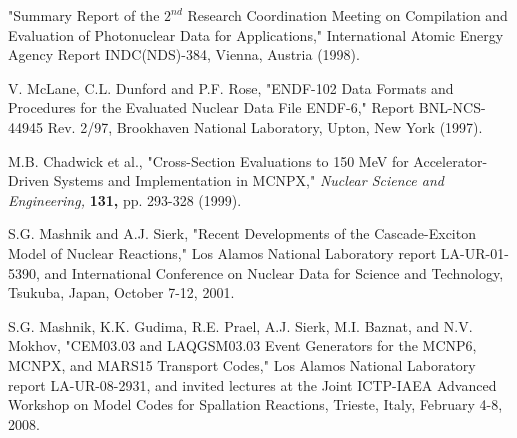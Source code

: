  "Summary Report of the $2^{nd}$ Research Coordination 
Meeting on Compilation and Evaluation of Photonuclear Data for 
Applications," International Atomic Energy Agency Report INDC(NDS)-384, 
Vienna, Austria (1998).

 V. McLane, C.L. Dunford and P.F. Rose, "ENDF-102 Data 
Formats and Procedures for the Evaluated Nuclear Data File ENDF-6," Report 
BNL-NCS-44945 Rev. 2/97, Brookhaven National Laboratory, Upton, New York 
(1997).

 M.B. Chadwick et al., "Cross-Section Evaluations to 
150 MeV for Accelerator-Driven Systems and Implementation in MCNPX," 
\textit{Nuclear Science and Engineering,} \textbf{131,} pp. 293-328 (1999).

 S.G. Mashnik and A.J. Sierk, "Recent Developments
of the Cascade-Exciton Model of Nuclear Reactions," Los Alamos National 
Laboratory report LA-UR-01-5390, and International Conference on Nuclear 
Data for Science and Technology, Tsukuba, Japan, October 7-12, 2001.

 S.G. Mashnik, K.K. Gudima, R.E. Prael, A.J. Sierk, 
M.I. Baznat, and N.V. Mokhov, "CEM03.03 and LAQGSM03.03 Event Generators
for the MCNP6, MCNPX, and MARS15 Transport Codes," Los Alamos National
Laboratory report LA-UR-08-2931, and invited lectures at the Joint
ICTP-IAEA Advanced Workshop on Model Codes for Spallation Reactions,
Trieste, Italy, February 4-8, 2008.
